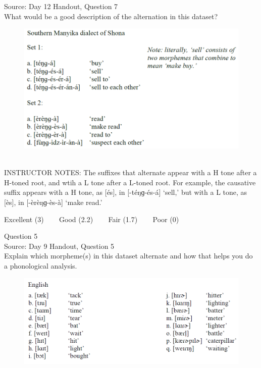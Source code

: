 \documentclass[12pt]{article}
\begin{document}
Source: Day 12 Handout, Question 7\\

What would be a good description of the alternation in this dataset?\\

\begin{figure}[H]
\includegraphics{../images/shona.png}
\end{figure}

~\\
INSTRUCTOR NOTES: The suffixes that alternate appear with a H tone after a H-toned root, and wtih a L tone after a L-toned root. For example, the causative suffix appears with a H tone, as [és], in [-téŋɡ-és-á] ‘sell,’ but with a L tone, as [ès], in [-èrèŋɡ-ès-à] ‘make read.’


\vfill
Excellent (3) ~~~ Good (2.2) ~~~ Fair (1.7) ~~~ Poor (0)
\newpage

{\large Question 5}\\

Source: Day 9 Handout, Question 5\\

Explain which morpheme(s) in this dataset alternate and how that helps you do a phonological analysis.\\

\begin{figure}[H]
\includegraphics{../images/english_t_flap.png}
\end{figure}
\end{document}
